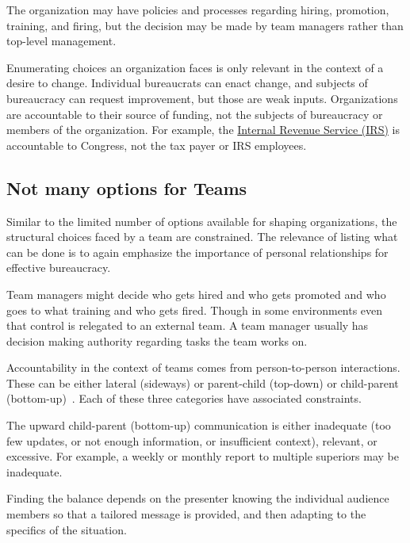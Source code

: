 The organization may have policies and processes regarding hiring, promotion, training, and firing, but the decision may be made by team managers rather than top-level management. 

Enumerating choices an organization faces is only relevant in the context of a desire to change. 
Individual bureaucrats can enact change, and subjects of bureaucracy can request improvement, but those are weak inputs. 
Organizations are accountable to their source of funding, not the subjects of bureaucracy or members of the organization. For example, the \href{https://en.wikipedia.org/wiki/Internal_Revenue_Service}{Internal Revenue Service (IRS)} 
is accountable to Congress, not the tax payer or IRS employees. 

\subsection*{Not many options for Teams}

Similar to the limited number of options available for shaping organizations, the structural choices faced by a team are constrained. The relevance of listing what can be done is to again emphasize the importance of personal relationships for effective bureaucracy. 

Team managers might decide who gets hired and who gets promoted and who goes to what training and who gets fired. Though in some environments even that control is relegated to an external team. A team manager usually has decision making authority regarding tasks the team works on. 

Accountability in the context of teams comes from person-to-person interactions. These can be either lateral (sideways) or parent-child (top-down) or child-parent (bottom-up)~\cite{2014_Jorgensen}. Each of these three categories have associated constraints.

The upward child-parent (bottom-up) communication is either inadequate (too few updates, or not enough information, or insufficient context), relevant, or excessive. For example, a weekly or monthly report to multiple superiors may be inadequate. 

Finding the balance depends on the presenter knowing the individual audience members so that a tailored message is provided, and then adapting to the specifics of the situation. 

